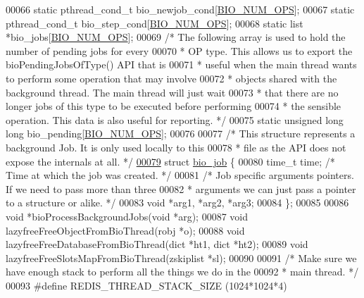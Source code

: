 \begin{DoxyCode}
00066 \textcolor{keyword}{static} pthread\_cond\_t bio\_newjob\_cond[\hyperlink{bio_8h_a544b0595052937cbb10e0ffd1f56d163}{BIO\_NUM\_OPS}];
00067 \textcolor{keyword}{static} pthread\_cond\_t bio\_step\_cond[\hyperlink{bio_8h_a544b0595052937cbb10e0ffd1f56d163}{BIO\_NUM\_OPS}];
00068 \textcolor{keyword}{static} list *bio\_jobs[\hyperlink{bio_8h_a544b0595052937cbb10e0ffd1f56d163}{BIO\_NUM\_OPS}];
00069 \textcolor{comment}{/* The following array is used to hold the number of pending jobs for every}
00070 \textcolor{comment}{ * OP type. This allows us to export the bioPendingJobsOfType() API that is}
00071 \textcolor{comment}{ * useful when the main thread wants to perform some operation that may involve}
00072 \textcolor{comment}{ * objects shared with the background thread. The main thread will just wait}
00073 \textcolor{comment}{ * that there are no longer jobs of this type to be executed before performing}
00074 \textcolor{comment}{ * the sensible operation. This data is also useful for reporting. */}
00075 \textcolor{keyword}{static} \textcolor{keywordtype}{unsigned} \textcolor{keywordtype}{long} \textcolor{keywordtype}{long} bio\_pending[\hyperlink{bio_8h_a544b0595052937cbb10e0ffd1f56d163}{BIO\_NUM\_OPS}];
00076 
00077 \textcolor{comment}{/* This structure represents a background Job. It is only used locally to this}
00078 \textcolor{comment}{ * file as the API does not expose the internals at all. */}
\hyperlink{structbio__job}{00079} \textcolor{keyword}{struct} \hyperlink{structbio__job}{bio\_job} \{
00080     time\_t time; \textcolor{comment}{/* Time at which the job was created. */}
00081     \textcolor{comment}{/* Job specific arguments pointers. If we need to pass more than three}
00082 \textcolor{comment}{     * arguments we can just pass a pointer to a structure or alike. */}
00083     \textcolor{keywordtype}{void} *arg1, *arg2, *arg3;
00084 \};
00085 
00086 \textcolor{keywordtype}{void} *bioProcessBackgroundJobs(\textcolor{keywordtype}{void} *arg);
00087 \textcolor{keywordtype}{void} lazyfreeFreeObjectFromBioThread(robj *o);
00088 \textcolor{keywordtype}{void} lazyfreeFreeDatabaseFromBioThread(dict *ht1, dict *ht2);
00089 \textcolor{keywordtype}{void} lazyfreeFreeSlotsMapFromBioThread(zskiplist *sl);
00090 
00091 \textcolor{comment}{/* Make sure we have enough stack to perform all the things we do in the}
00092 \textcolor{comment}{ * main thread. */}
00093 \textcolor{preprocessor}{#}\textcolor{preprocessor}{define} \textcolor{preprocessor}{REDIS\_THREAD\_STACK\_SIZE} \textcolor{preprocessor}{(}1024\textcolor{preprocessor}{*}1024\textcolor{preprocessor}{*}4\textcolor{preprocessor}{)}

\end{DoxyCode}
